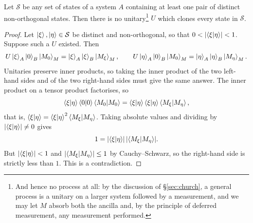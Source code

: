 \documentclass[a4paper]{scrartcl}
\newcommand{\Ss}{\mathcal{S}}
\begin{document}
\begin{center}
\end{center}

\begin{theorem}
	Let $\Ss$ be any set of states of a system $A$ containing at least one pair of distinct non-orthogonal states. Then there is no unitary\footnote{And hence no process at all: by the discussion of \S\ref{sec:church}, a general process is a unitary on a larger system followed by a measurement, and we may let $M$ absorb both the ancilla and, by the principle of deferred measurement, any measurement performed.} $U$ which clones every state in $\Ss$.
\end{theorem}

\begin{proof}
	Let $\ket{\xi}, \ket{\eta} \in \Ss$ be distinct and non-orthogonal, so that $0 < \abs{\ip{\xi}{\eta}} < 1$. Suppose such a $U$ existed. Then
	$$U\ket{\xi}_A\ket{0}_B\ket{M_0}_M = \ket{\xi}_A\ket{\xi}_B\ket{M_\xi}_M, \qquad U\ket{\eta}_A\ket{0}_B\ket{M_0}_M = \ket{\eta}_A\ket{\eta}_B\ket{M_\eta}_M.$$
	Unitaries preserve inner products, so taking the inner product of the two left-hand sides and of the two right-hand sides must give the same answer. The inner product on a tensor product factorises, so
	$$\ip{\xi}{\eta}\ip{0}{0}\ip{M_0}{M_0} = \ip{\xi}{\eta}\ip{\xi}{\eta}\ip{M_\xi}{M_\eta},$$
	that is, $\ip{\xi}{\eta} = \ip{\xi}{\eta}^2 \ip{M_\xi}{M_\eta}$. Taking absolute values and dividing by $\abs{\ip{\xi}{\eta}} \neq 0$ gives
	$$1 = \abs{\ip{\xi}{\eta}}\,\abs{\ip{M_\xi}{M_\eta}}.$$
	But $\abs{\ip{\xi}{\eta}} < 1$ and $\abs{\ip{M_\xi}{M_\eta}} \leq 1$ by Cauchy--Schwarz, so the right-hand side is strictly less than $1$. This is a contradiction.
\end{proof}
\end{document}
